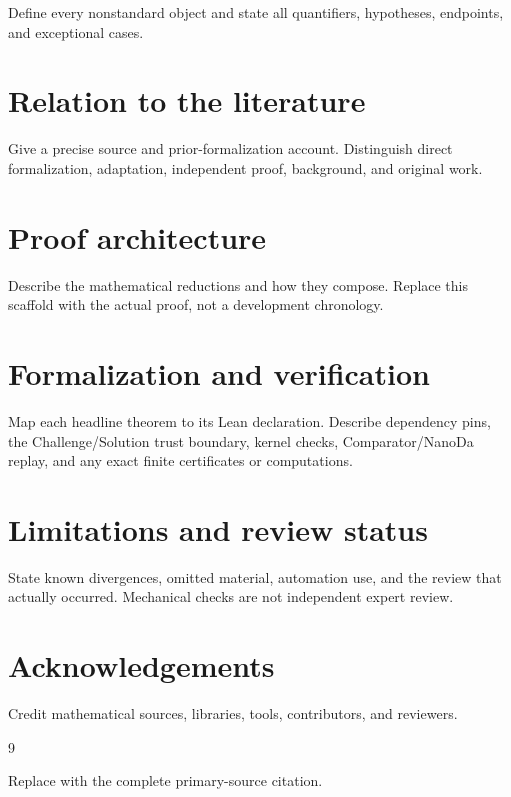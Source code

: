 \documentclass[11pt]{amsart}
\theoremstyle{definition}
\theoremstyle{remark}
\begin{document}
Define every nonstandard object and state all quantifiers, hypotheses,
endpoints, and exceptional cases.

\section{Relation to the literature}

Give a precise source and prior-formalization account. Distinguish direct
formalization, adaptation, independent proof, background, and original work.

\section{Proof architecture}

Describe the mathematical reductions and how they compose. Replace this
scaffold with the actual proof, not a development chronology.

\section{Formalization and verification}

Map each headline theorem to its Lean declaration. Describe dependency pins,
the Challenge/Solution trust boundary, kernel checks, Comparator/NanoDa replay,
and any exact finite certificates or computations.

\section{Limitations and review status}

State known divergences, omitted material, automation use, and the review that
actually occurred. Mechanical checks are not independent expert review.

\section*{Acknowledgements}

Credit mathematical sources, libraries, tools, contributors, and reviewers.

\begin{thebibliography}{9}

Replace with the complete primary-source citation.

\end{thebibliography}
\end{document}
